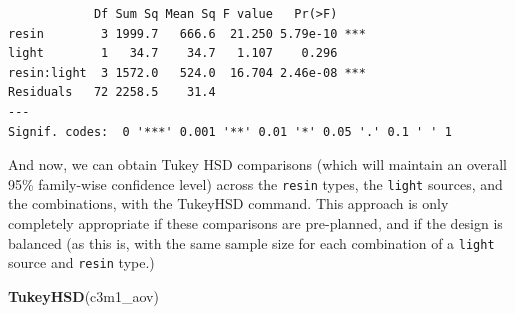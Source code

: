 \documentclass[]{book}
\newenvironment{Shaded}{\begin{snugshade}}{\end{snugshade}}
\newcommand{\KeywordTok}[1]{\textcolor[rgb]{0.13,0.29,0.53}{\textbf{#1}}}
\newcommand{\NormalTok}[1]{#1}
\theoremstyle{definition}
\theoremstyle{definition}
\theoremstyle{definition}
\theoremstyle{remark}
\begin{document}
\begin{verbatim}
            Df Sum Sq Mean Sq F value   Pr(>F)    
resin        3 1999.7   666.6  21.250 5.79e-10 ***
light        1   34.7    34.7   1.107    0.296    
resin:light  3 1572.0   524.0  16.704 2.46e-08 ***
Residuals   72 2258.5    31.4                     
---
Signif. codes:  0 '***' 0.001 '**' 0.01 '*' 0.05 '.' 0.1 ' ' 1
\end{verbatim}

And now, we can obtain Tukey HSD comparisons (which will maintain an
overall 95\% family-wise confidence level) across the \texttt{resin}
types, the \texttt{light} sources, and the combinations, with the
TukeyHSD command. This approach is only completely appropriate if these
comparisons are pre-planned, and if the design is balanced (as this is,
with the same sample size for each combination of a \texttt{light}
source and \texttt{resin} type.)

\begin{Shaded}
\begin{Highlighting}[]
\KeywordTok{TukeyHSD}\NormalTok{(c3m1_aov)}
\end{Highlighting}
\end{Shaded}
\end{document}
